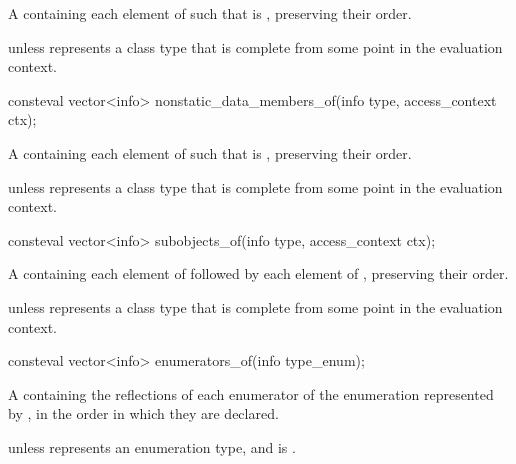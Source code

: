 \begin{itemdescr}
\pnum
\returns
A  containing each element  of 
such that  is ,
preserving their order.

\pnum
\throws
{} unless
 represents a class type
that is complete from some point in the evaluation context.
\end{itemdescr}


%
\begin{itemdecl}
consteval vector<info> nonstatic_data_members_of(info type, access_context ctx);
\end{itemdecl}

\begin{itemdescr}
\pnum
\returns
A  containing each element  of 
such that  is ,
preserving their order.

\pnum
\throws
{} unless
 represents a class type
that is complete from some point in the evaluation context.
\end{itemdescr}

%
\begin{itemdecl}
consteval vector<info> subobjects_of(info type, access_context ctx);
\end{itemdecl}

\begin{itemdescr}
\pnum
\returns
A  containing each element of 
followed by each element of ,
preserving their order.

\pnum
\throws
{} unless
 represents a class type
that is complete from some point in the evaluation context.
\end{itemdescr}

%
\begin{itemdecl}
consteval vector<info> enumerators_of(info type_enum);
\end{itemdecl}

\begin{itemdescr}
\pnum
\returns
A  containing the reflections of each enumerator
of the enumeration represented by ,
in the order in which they are declared.

\pnum
\throws
{} unless
 represents an enumeration type,
and  is .
\end{itemdescr}

